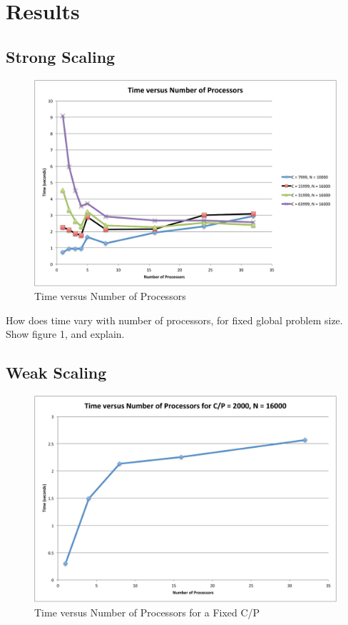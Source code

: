 \documentclass[11pt]{article} %
\begin{document}
\section{Results}

\subsection{Strong Scaling}

\begin{figure}
\begin{centering}
\includegraphics[width=0.5\paperwidth]{figures/TvsP.pdf}
\caption{Time versus Number of Processors}
\label{TvsP}
\end{centering}
\end{figure}

How does time vary with number of processors, for fixed global problem size. Show figure 1, and explain.

\subsection{Weak Scaling}

\begin{figure}
\begin{centering}
\includegraphics[width=0.5\paperwidth]{figures/TvsP-fixed.pdf}
\caption{Time versus Number of Processors for a Fixed C/P}
\label{TvsP-fixed}
\end{centering}
\end{figure}
\end{document}
